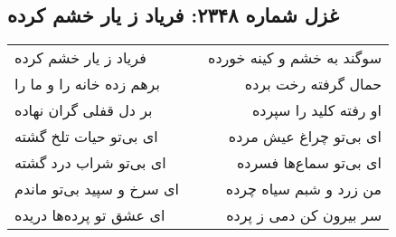 \begin{center}
\section*{غزل شماره ۲۳۴۸: فریاد ز یار خشم کرده}
\label{sec:2348}
\begin{longtable}{l p{0.5cm} r}
فریاد ز یار خشم کرده
&&
سوگند به خشم و کینه خورده
\\
برهم زده خانه را و ما را
&&
حمال گرفته رخت برده
\\
بر دل قفلی گران نهاده
&&
او رفته کلید را سپرده
\\
ای بی‌تو حیات تلخ گشته
&&
ای بی‌تو چراغ عیش مرده
\\
ای بی‌تو شراب درد گشته
&&
ای بی‌تو سماع‌ها فسرده
\\
ای سرخ و سپید بی‌تو ماندم
&&
من زرد و شبم سیاه چرده
\\
ای عشق تو پرده‌ها دریده
&&
سر بیرون کن دمی ز پرده
\\
\end{longtable}
\end{center}
